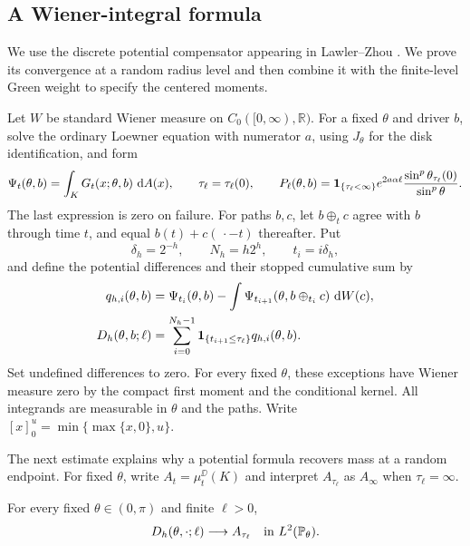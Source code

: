 \subsection{A Wiener-integral formula}

We use the discrete potential compensator appearing in
Lawler--Zhou \cite[Theorem~1 and its proof]{LawlerZhou2013}.
We prove its convergence at a random radius level and then combine it
with the finite-level Green weight to specify the centered moments.

Let $W$ be standard Wiener measure on
$C_0([0,\infty),\mathbb R)$.  For a fixed $\theta$ and driver $b$, solve
the ordinary Loewner equation with numerator $a$, using $J_\theta$ for
the disk identification, and form
\[
 \Psi_t(\theta,b)=\int_K G_t(x;\theta,b)\,\mathop{}\!\mathrm{d} A(x),
 \qquad \tau_\ell=\tau_\ell(0),
 \qquad
 P_\ell(\theta,b)
 =\mathbf 1_{\{\tau_\ell<\infty\}}e^{2a\alpha\ell}
       \frac{\sin^p\theta_{\tau_\ell}(0)}{\sin^p\theta}.
\]
The last expression is zero on failure.  For paths $b,c$, let
$b\oplus_t c$ agree with $b$ through time $t$, and equal
$b(t)+c(\,\cdot-t)$ thereafter.  Put
\[
 \delta_h=2^{-h},\qquad N_h=h2^h,\qquad t_i=i\delta_h,
\]
and define the potential differences and their stopped cumulative sum by
\begin{align}
 q_{h,i}(\theta,b)
   &=\Psi_{t_i}(\theta,b)
       -\int\Psi_{t_{i+1}}(\theta,b\oplus_{t_i}c)\,\mathop{}\!\mathrm{d} W(c),
       \label{coef:increments}\\
 D_h(\theta,b;\ell)
   &=\sum_{i=0}^{N_h-1}\mathbf 1_{\{t_{i+1}\le\tau_\ell\}}
                      q_{h,i}(\theta,b).
       \label{coef:discrete-mass}
\end{align}
Set undefined differences to zero.  For every fixed $\theta$, these
exceptions have Wiener measure zero by the compact first moment and
the conditional kernel.  All integrands are measurable in $\theta$ and
the paths.  Write $[x]_0^u=\min\{\max\{x,0\},u\}$.

The next estimate explains why a potential formula recovers mass at a
random endpoint. For fixed $\theta$, write $A_t=\mu_t^{\DD}(K)$ and
interpret $A_{\tau_\ell}$ as $A_\infty$ when $\tau_\ell=\infty$.

\begin{lemma}\label{coef:recovery}
For every fixed $\theta\in(0,\pi)$ and finite $\ell>0$,
\[
 D_h(\theta,\cdot;\ell)\longrightarrow A_{\tau_\ell}
 \quad\text{in }L^2(\mathbb P_\theta).
\]
\end{lemma}

